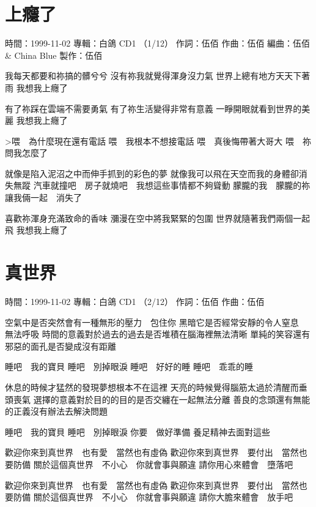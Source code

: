 \documentclass[UTF8,a4paper,oneside,twocolumn,12pt]{ctexbook}
\newcommand{\infopair}[2]{\textbullet #1：#2}
\newcommand{\zc}[1][伍佰]{\infopair{作詞}{#1}}
\newcommand{\zq}[1][伍佰]{\infopair{作曲}{#1}}
\newcommand{\bq}[1][伍佰]{\infopair{編曲}{#1}}
\newcommand{\zj}[1]{\infopair{專輯}{#1}}
\newcommand{\zz}[1]{\infopair{製作}{#1}}
\newcommand{\sj}[1]{\infopair{時間}{#1}}
\newenvironment{info}{\begin{flushleft}\kaishu
	}
	{\end{flushleft}\normalsize\yahei\par}
\newenvironment{lyric}{
	}
{}
\begin{document}
\section{上癮了}
\begin{info}
	\sj{1999-11-02}
	\zj{白鴿 CD1 （1/12）}
	\zc
	\zq
	\bq[伍佰 \& China Blue]
	\zz{伍佰}

\end{info}
\begin{lyric}
	我每天都要和祢搞的髒兮兮
	沒有祢我就覺得渾身沒力氣
	世界上總有地方天天下著雨
	我想我上癮了

	有了祢踩在雲端不需要勇氣
	有了祢生活變得非常有意義
	一睜開眼就看到世界的美麗
	我想我上癮了

	>喂　為什麼現在還有電話
	喂　我根本不想接電話
	喂　真後悔帶著大哥大
	喂　祢問我怎麼了

	就像是陷入泥沼之中而伸手抓到的彩色的夢
	就像我可以飛在天空而我的身體卻消失無蹤
	汽車就撞吧　房子就燒吧　我想這些事情都不夠聳動
	朦朧的我　朦朧的祢　讓我倆一起　消失了

	喜歡祢渾身充滿致命的香味
	瀰漫在空中將我緊緊的包圍
	世界就隨著我們兩個一起飛
	我想我上癮了
\end{lyric}

\section{真世界}
\begin{info}
	\sj{1999-11-02}
	\zj{白鴿 CD1 （2/12）}
	\zc
	\zq
\end{info}
\begin{lyric}
	空氣中是否突然會有一種無形的壓力　包住你
	黑暗它是否經常安靜的令人窒息　無法呼吸
	時間的意義對於過去的過去是否堆積在腦海裡無法清晰
	單純的笑容還有邪惡的面孔是否變成沒有距離

	睡吧　我的寶貝
	睡吧　別掉眼淚
	睡吧　好好的睡
	睡吧　乖乖的睡

	休息的時候才猛然的發現夢想根本不在這裡
	天亮的時候覺得腦筋太過於清醒而垂頭喪氣
	選擇的意義對於目的的目的是否交纏在一起無法分離
	善良的念頭還有無能的正義沒有辦法去解決問題

	睡吧　我的寶貝
	睡吧　別掉眼淚
	你要　做好準備
	養足精神去面對這些

	歡迎你來到真世界　也有愛　當然也有虛偽
	歡迎你來到真世界　要付出　當然也要防備
	關於這個真世界　不小心　你就會事與願違
	請你用心來體會　墮落吧

	歡迎你來到真世界　也有愛　當然也有虛偽
	歡迎你來到真世界　要付出　當然也要防備
	關於這個真世界　不小心　你就會事與願違
	請你大膽來體會　放手吧
\end{lyric}
\end{document}
